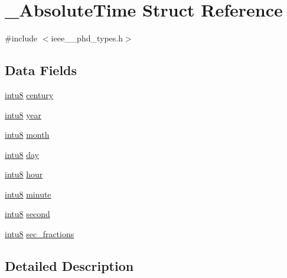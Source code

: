 \hypertarget{struct___absolute_time}{}\section{\+\_\+\+Absolute\+Time Struct Reference}
\label{struct___absolute_time}


{\ttfamily \#include $<$ieee\+\_\+\_\+phd\+\_\+types.\+h$>$}

\subsection*{Data Fields}
\begin{DoxyCompactItemize}
\item 
\hyperlink{ieee__11073__phd__types_8h_ae21d5428a584a153613cbe335630d3f4}{intu8} \hyperlink{struct___absolute_time_afce645bc92dadedc5b151101f0781730}{century}
\item 
\hyperlink{ieee__11073__phd__types_8h_ae21d5428a584a153613cbe335630d3f4}{intu8} \hyperlink{struct___absolute_time_a7b57e47ace93ac7c9f1dd119351c5753}{year}
\item 
\hyperlink{ieee__11073__phd__types_8h_ae21d5428a584a153613cbe335630d3f4}{intu8} \hyperlink{struct___absolute_time_ae1364dc4dd11693c36213602e562ad0a}{month}
\item 
\hyperlink{ieee__11073__phd__types_8h_ae21d5428a584a153613cbe335630d3f4}{intu8} \hyperlink{struct___absolute_time_a138c3453b4e070c4b7fe82716853a657}{day}
\item 
\hyperlink{ieee__11073__phd__types_8h_ae21d5428a584a153613cbe335630d3f4}{intu8} \hyperlink{struct___absolute_time_ac646da02ad7b45eeffe4b9297bf359ad}{hour}
\item 
\hyperlink{ieee__11073__phd__types_8h_ae21d5428a584a153613cbe335630d3f4}{intu8} \hyperlink{struct___absolute_time_a58daa693afe48aa27fae8d0abb7b857a}{minute}
\item 
\hyperlink{ieee__11073__phd__types_8h_ae21d5428a584a153613cbe335630d3f4}{intu8} \hyperlink{struct___absolute_time_a31aae03e13deba287b27a6e34e1066de}{second}
\item 
\hyperlink{ieee__11073__phd__types_8h_ae21d5428a584a153613cbe335630d3f4}{intu8} \hyperlink{struct___absolute_time_a97354dc68233fac75d21f09e781612bd}{sec\+\_\+fractions}
\end{DoxyCompactItemize}


\subsection{Detailed Description}


